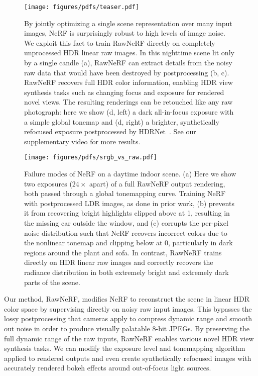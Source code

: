 \begin{figure}[]
    \centering
    \texttt{[image: figures/pdfs/teaser.pdf]}  
    \caption{By jointly optimizing a single scene representation over many input images, NeRF is surprisingly robust to high levels of image noise. We exploit this fact to train RawNeRF directly on completely unprocessed HDR linear raw images. In this nighttime scene lit only by a single candle (a), RawNeRF can extract details from the noisy raw data that would have been destroyed by postprocessing (b, c). RawNeRF recovers full HDR color information, enabling HDR view synthesis tasks such as changing focus and exposure for rendered novel views. The resulting renderings can be retouched like any raw photograph: here we show (d, left) a dark all-in-focus exposure with a simple global tonemap and (d, right) a brighter, synthetically refocused exposure postprocessed by HDRNet~\cite{hdrnet}.
    See our supplementary video for more results.
    }
    \label{fig:teaser}
\end{figure}



\begin{figure*}
    \centering
    \texttt{[image: figures/pdfs/srgb\_vs\_raw.pdf]}
    \caption{
    Failure modes of NeRF on a daytime indoor scene.
    (a) Here we show two exposures ($24\times$ apart) of a full RawNeRF output rendering, both passed through a global tonemapping curve.
    Training NeRF with postprocessed LDR images, as done in prior work, (b) prevents it from recovering bright highlights clipped above at 1, resulting in the missing car outside the window, and (c) corrupts the per-pixel noise distribution such that NeRF recovers incorrect colors due to the nonlinear tonemap and clipping below at 0, particularly in dark regions around the plant and sofa. In contrast, RawNeRF trains directly on HDR linear raw images and correctly recovers the radiance distribution in both extremely bright and extremely dark parts of the scene.
    }
    \label{fig:raw_vs_srgb}
\end{figure*}





Our method, RawNeRF, modifies NeRF to reconstruct the scene in linear HDR color space by supervising directly on noisy raw input images.
This bypasses the lossy postprocessing that cameras apply to compress dynamic range and smooth out noise in order to produce visually palatable 8-bit JPEGs.
By preserving the full dynamic range of the raw inputs, RawNeRF enables various novel HDR view synthesis tasks. We can modify the exposure level and tonemapping algorithm applied to rendered outputs and even create synthetically refocused images with accurately rendered bokeh effects around out-of-focus light sources. 

